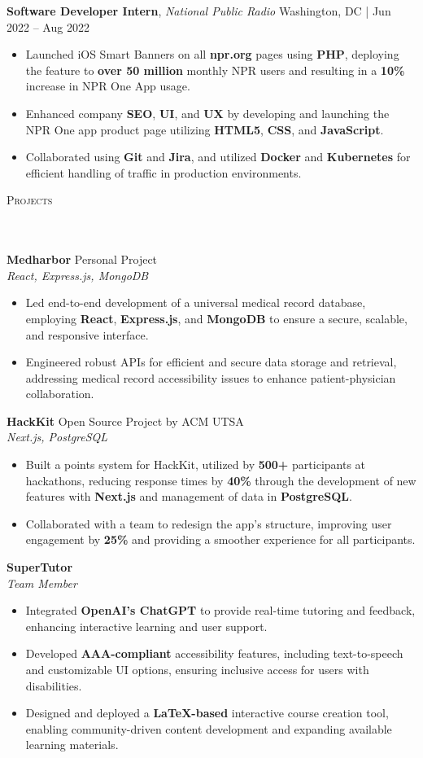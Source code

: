 \documentclass[10pt, letterpaper]{article}
\newcommand{\lineunder} {
    \vspace*{-4pt} \\ %
    \hspace*{-15pt} \hrulefill \\
}
\newcommand{\header}[1] {
    {\textsc{\small #1}}
    \lineunder %
}
\begin{document}
\textbf{Software Developer Intern}, \textit{National Public Radio} \hfill Washington, DC | Jun 2022 – Aug 2022
\begin{itemize}
    \item Launched iOS Smart Banners on all \textbf{npr.org} pages using \textbf{PHP}, deploying the feature to \textbf{over 50 million} monthly NPR users and resulting in a \textbf{10\%} increase in NPR One App usage.
    \item Enhanced company \textbf{SEO}, \textbf{UI}, and \textbf{UX} by developing and launching the NPR One app product page utilizing \textbf{HTML5}, \textbf{CSS}, and \textbf{JavaScript}.
    \item Collaborated using \textbf{Git} and \textbf{Jira}, and utilized \textbf{Docker} and \textbf{Kubernetes} for efficient handling of traffic in production environments.
\end{itemize}

\header{Projects}
\textbf{Medharbor} \hfill Personal Project \\
\textit{React, Express.js, MongoDB}
\begin{itemize}
    \item Led end-to-end development of a universal medical record database, employing \textbf{React}, \textbf{Express.js}, and \textbf{MongoDB} to ensure a secure, scalable, and responsive interface.
    \item Engineered robust APIs for efficient and secure data storage and retrieval, addressing medical record accessibility issues to enhance patient-physician collaboration.
\end{itemize}

\textbf{HackKit} \hfill Open Source Project by ACM UTSA \\
\textit{Next.js, PostgreSQL}
\begin{itemize}
    \item Built a points system for HackKit, utilized by \textbf{500+} participants at hackathons, reducing response times by \textbf{40\%} through the development of new features with \textbf{Next.js} and management of data in \textbf{PostgreSQL}.
    \item Collaborated with a team to redesign the app’s structure, improving user engagement by \textbf{25\%} and providing a smoother experience for all participants.
\end{itemize}

\textbf{SuperTutor} \\
\textit{Team Member} 
\begin{itemize}
    \item Integrated \textbf{OpenAI’s ChatGPT} to provide real-time tutoring and feedback, enhancing interactive learning and user support.
    \item Developed \textbf{AAA-compliant} accessibility features, including text-to-speech and customizable UI options, ensuring inclusive access for users with disabilities.
    \item Designed and deployed a \textbf{LaTeX-based} interactive course creation tool, enabling community-driven content development and expanding available learning materials.
\end{itemize}
\end{document}
